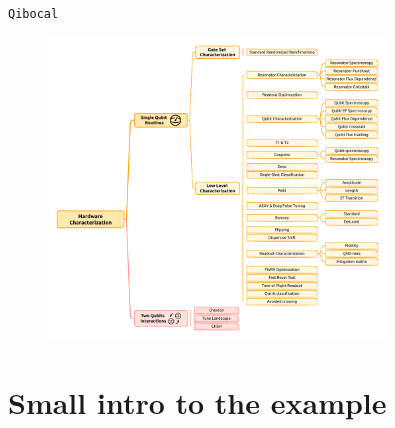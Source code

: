 \documentclass[8pt, xcolor={svgnames}, hyperref={linkcolor=black}]{beamer}
\begin{document}
\begin{frame}{\texttt{Qibocal}}
\begin{figure}  
   \includegraphics[width=0.8\textwidth]{figures/qpu_characterization.pdf}
\end{figure}
\end{frame}

\section{Small intro to the example}
\end{document}
